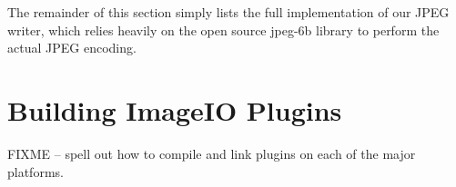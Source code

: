 \bigskip
\bigskip

\noindent
The remainder of this section simply lists the full implementation of
our JPEG writer, which relies heavily on the open source {\fn jpeg-6b}
library to perform the actual JPEG encoding.



\section{Building ImageIO Plugins}
\label{sec:buildingplugins}

FIXME -- spell out how to compile and link plugins on each of the major
platforms.


\chapwidthend
